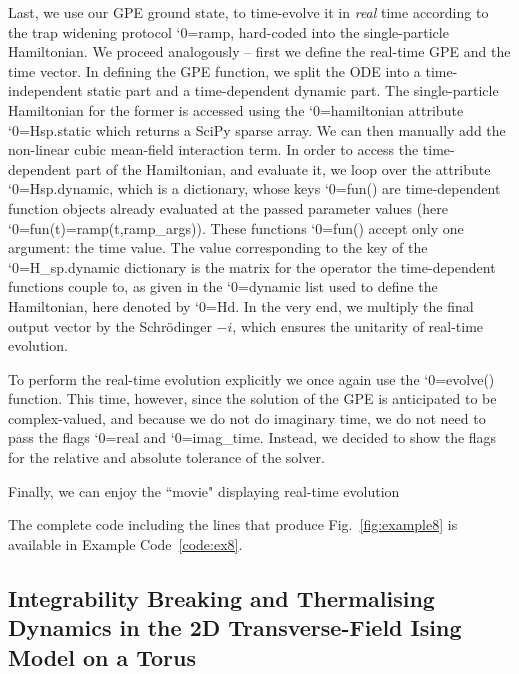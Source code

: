\documentclass{SciPost}
\newcommand\0{\scalebox{-1}[1]{0}}
\let\svttfamily\ttfamily
\renewcommand\ttfamily{\svttfamily\catcode`0=\active }
\renewcommand\texttt{\bgroup\ttfamily\texttthelp}
\def\texttthelp#1{#1\egroup}
\newcommand{\GPcode}{example8.py}
\begin{document}
Last, we use our GPE ground state, to time-evolve it in \emph{real} time according to the trap widening protocol \texttt{ramp}, hard-coded into the single-particle Hamiltonian. We proceed analogously -- first we define the real-time GPE and the time vector. In defining the GPE function, we split the ODE into a time-independent static part and a time-dependent dynamic part. The single-particle Hamiltonian for the former is accessed using the \texttt{hamiltonian} attribute \texttt{Hsp.static} which returns a SciPy sparse array. We can then manually add the non-linear cubic mean-field interaction term. In order to access the time-dependent part of the Hamiltonian, and evaluate it, we loop over the attribute \texttt{Hsp.dynamic}, which is a dictionary, whose keys \texttt{fun()} are time-dependent function objects already evaluated at the passed parameter values  (here \texttt{fun(t)=ramp(t,ramp\_args)}). These functions \texttt{fun()} accept only one argument: the time value. The value corresponding to the key of the \texttt{H\_sp.dynamic} dictionary is the matrix for the operator the time-dependent functions couple to, as given in the \texttt{dynamic} list used to define the Hamiltonian, here denoted by \texttt{Hd}. In the very end, we multiply the final output vector by the Schr\"odinger $-i$, which ensures the unitarity of real-time evolution.

To perform the real-time evolution explicitly we once again use the \texttt{evolve()} function. This time, however, since the solution of the GPE is anticipated to be complex-valued, and because we do not do imaginary time, we do not need to pass the flags \texttt{real} and \texttt{imag\_time}. Instead, we decided to show the flags for the relative and absolute tolerance of the solver. 

Finally, we can enjoy the ``movie" displaying real-time evolution


The complete code including the lines that produce Fig.~\ref{fig:example8} is available in Example Code~\ref{code:ex8}.



\subsection{Integrability Breaking and Thermalising Dynamics in the 2D Transverse-Field Ising Model on a Torus}
\label{subsec:higher_spin}
\end{document}
